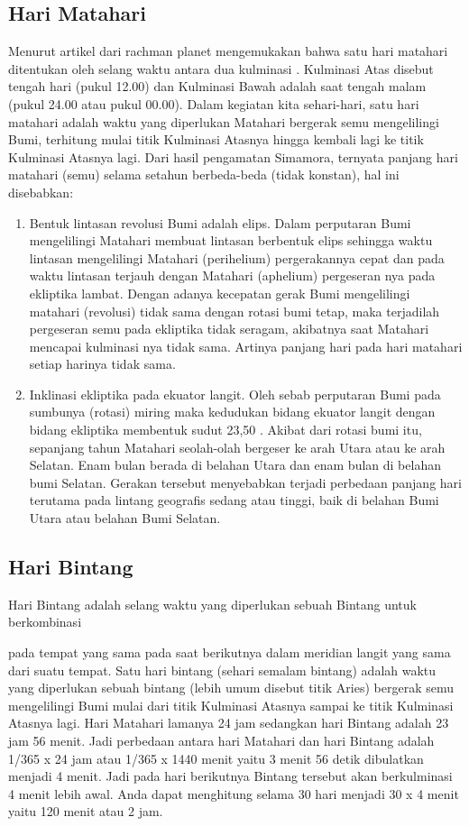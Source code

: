\subsection{Hari Matahari}
 Menurut artikel dari rachman planet mengemukakan bahwa satu hari matahari ditentukan
 oleh selang waktu antara dua kulminasi \cite{rachmanplanet}. Kulminasi Atas disebut tengah hari (pukul 12.00)
 dan Kulminasi Bawah adalah saat tengah malam (pukul 24.00 atau pukul 00.00). 
 Dalam kegiatan kita sehari-hari, satu hari matahari adalah waktu yang diperlukan
 Matahari bergerak semu mengelilingi Bumi, terhitung mulai titik Kulminasi Atasnya
 hingga kembali lagi ke titik Kulminasi Atasnya lagi. Dari hasil pengamatan Simamora, ternyata 
 panjang hari matahari (semu) selama setahun berbeda-beda (tidak konstan), 
 hal ini disebabkan:
 \begin{enumerate}
 \item Bentuk lintasan revolusi Bumi adalah elips.
 Dalam perputaran Bumi mengelilingi Matahari membuat lintasan berbentuk elips 
 sehingga waktu lintasan mengelilingi Matahari (perihelium) 
 pergerakannya cepat dan pada waktu lintasan terjauh 
 dengan Matahari (aphelium) pergeseran nya pada ekliptika lambat. 
 Dengan adanya kecepatan gerak Bumi mengelilingi matahari (revolusi)
 tidak sama dengan rotasi bumi tetap, maka terjadilah pergeseran semu
 pada ekliptika tidak seragam, akibatnya saat Matahari mencapai 
 kulminasi nya tidak sama. Artinya panjang hari pada hari matahari 
 setiap harinya tidak sama.
 
 \item	Inklinasi ekliptika pada ekuator langit.
 Oleh sebab perputaran Bumi pada sumbunya (rotasi) miring maka kedudukan
 bidang ekuator langit dengan bidang ekliptika membentuk sudut 23,50 .
 Akibat dari rotasi bumi itu, sepanjang tahun Matahari seolah-olah bergeser ke arah
 Utara atau ke arah Selatan. Enam bulan berada di belahan Utara dan 
 enam bulan di belahan bumi Selatan. Gerakan tersebut menyebabkan 
 terjadi perbedaan panjang hari terutama pada lintang geografis sedang
 atau tinggi, baik di belahan Bumi Utara atau belahan Bumi Selatan.
 \end{enumerate}
\subsection{Hari Bintang}

Hari Bintang adalah selang waktu yang diperlukan sebuah Bintang untuk berkombinasi 

 pada tempat yang sama pada saat berikutnya dalam meridian langit yang 
 sama dari suatu tempat. Satu hari bintang (sehari semalam bintang) adalah 
 waktu yang diperlukan sebuah bintang (lebih umum disebut titik Aries) bergerak semu
 mengelilingi Bumi mulai dari titik Kulminasi Atasnya sampai ke titik Kulminasi Atasnya 
 lagi. Hari Matahari lamanya 24 jam sedangkan hari Bintang adalah 23 jam 56 menit. 
 Jadi perbedaan antara hari Matahari dan  hari Bintang adalah 1/365 x 24 jam atau 
 1/365 x 1440 menit yaitu 3 menit 56 detik  dibulatkan menjadi 4 menit. 
 Jadi pada hari berikutnya Bintang tersebut akan  berkulminasi 4 menit lebih awal.
 Anda dapat menghitung selama 30 hari menjadi  30 x 4 menit yaitu 120 menit atau 2 jam. 

